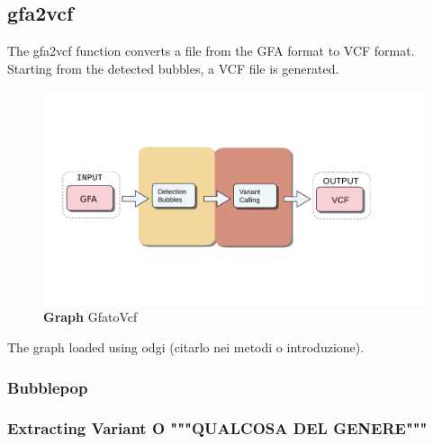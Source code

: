 

\subsection{gfa2vcf}
The gfa2vcf function converts a file from the GFA format to VCF format. Starting from the detected bubbles, a VCF file is generated.

\begin{figure}[H]
\centering
\includegraphics[width=1.10\textwidth]{fig/gfatovcf.pdf}
\decoRule
\caption{\textbf{Graph} GfatoVcf}
\label{fig:vgpop.pdf}
\end{figure}




The graph loaded using odgi (citarlo nei metodi o introduzione). 
\setcounter{secnumdepth}{3}
\subsubsection{Bubblepop} %
\subsubsection{Extracting Variant O """QUALCOSA DEL GENERE"""}

